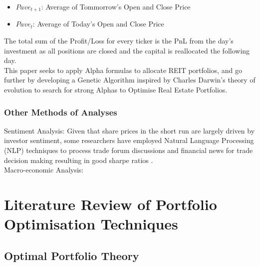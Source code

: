 \documentclass[a4paper,12pt]{report}
\numberwithin{equation}{section}
\theoremstyle{definition}
\begin{document}
\begin{itemize}
  \item {$Pave_{t+1}$: Average of Tommorrow's Open and Close Price}
  \item {$Pave_{t}$: Average of Today's Open and Close Price}
\end{itemize}

The total sum of the Profit/Loss for every ticker is the PnL from the day's investment as all positions are closed and the capital is reallocated the following day. \\

This paper seeks to apply Alpha formulas to allocate REIT portfolios, and go further by developing a Genetic Algorithm inspired by Charles Darwin's theory of evolution to search for strong Alphas to Optimise Real Estate Portfolios. 

\subsection{Other Methods of Analyses}
Sentiment Analysis: Given that share prices in the short run are largely driven by investor sentiment, some researchers have employed Natural Language Processing (NLP) techniques to process trade forum discussions and financial news for trade decision making resulting in good sharpe ratios \cite{alexandria_unlocking_2023}. \\

Macro-economic Analysis: 


\chapter{Literature Review of Portfolio Optimisation Techniques}
\section{Optimal Portfolio Theory}
\end{document}
